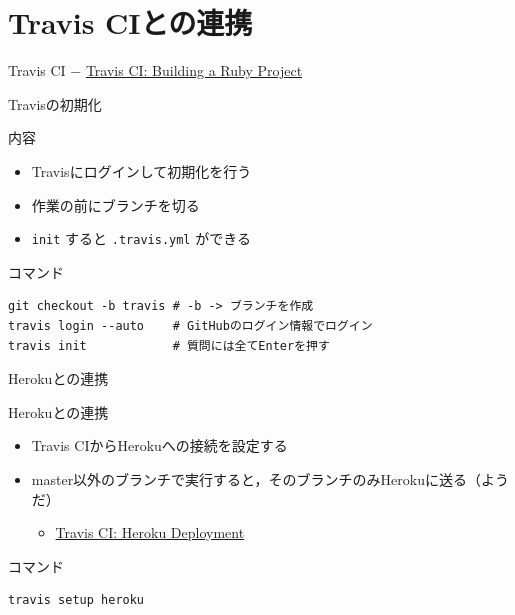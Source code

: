 \documentclass[t, aspectratio=169]{beamer}
\begin{document}
\section{Travis CIとの連携}
\label{sec-7-3}
\begin{frame}[label=sec-7-3-1]{Travis CI}
− \href{http://docs.travis-ci.com/user/languages/ruby/}{Travis CI: Building a Ruby Project}
\end{frame}
\begin{frame}[fragile,label=sec-7-3-2]{Travisの初期化}
 \begin{block}{内容}
\begin{itemize}
\item Travisにログインして初期化を行う
\item 作業の前にブランチを切る
\item \texttt{init} すると \texttt{.travis.yml} ができる
\end{itemize}
\end{block}

\begin{block}{コマンド}
\begin{verbatim}
git checkout -b travis # -b -> ブランチを作成
travis login --auto    # GitHubのログイン情報でログイン
travis init            # 質問には全てEnterを押す
\end{verbatim}
\end{block}
\end{frame}
\begin{frame}[fragile,label=sec-7-3-3]{Herokuとの連携}
 \begin{block}{Herokuとの連携}
\begin{itemize}
\item Travis CIからHerokuへの接続を設定する
\item master以外のブランチで実行すると，そのブランチのみHerokuに送る（ようだ）
\begin{itemize}
\item \href{http://docs.travis-ci.com/user/deployment/heroku/}{Travis CI: Heroku Deployment}
\end{itemize}
\end{itemize}
\end{block}

\begin{block}{コマンド}
\begin{verbatim}
travis setup heroku
\end{verbatim}
\end{block}
\end{frame}
\end{document}

